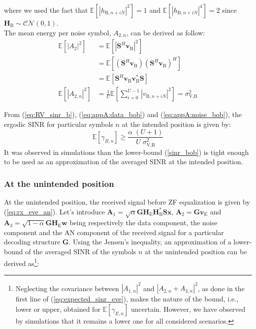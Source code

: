 \documentclass[journal,comsoc]{IEEEtran}
\newcommand{\module}[1]{\left|#1\right|}
\newcommand{\EX}[1]{\mathbb{E} \left[#1\right]}%
\newcommand{\HE}{\textbf{H}_{\text{E}}}
\newcommand{\HB}{\textbf{H}_{\text{B}}}
\newcommand{\vb}{\textbf{v}_{\text{B}}}
\newcommand{\spread}{\textbf{S}}
\newcommand{\w}{\textbf{w}}
\begin{document}
where we used the fact that $\EX{\left| h_{\text{B}, n + iN}\right|^2} = 1$ and $\EX{\left| h_{\text{B}, n + iN}\right|^4} = 2$ since $\HB \sim \mathcal{CN}(0,1)$.\\
The mean energy per noise symbol, $A_{2,n}$, can be derived as follow:
\begin{equation}
	\begin{split}
	\EX{|A_2|^2} &=  \EX{\module{\spread^H \vb}^2} \\
	&= \EX{\left(\spread^H \vb \right)\left(\spread^H \vb \right)^H} \\
	&=\EX{\spread^H \vb \vb^* \spread } \\
	\EX{|A_{2,n}|^2} &= \frac{1}{U} \EX{\sum_{i=0}^{U-1} |v_{\text{B}, n + iN}|^2} = \sigma^2_{\text{V,B}}
	\end{split}
	\label{eq:appA:noise_bob}
\end{equation}

From (\ref{eq:RV_sinr_b}), (\ref{eq:appA:data_bob}) and (\ref{eq:appA:noise_bob}), the ergodic SINR for particular symbols $n$ at the intended position is given by:
\begin{equation}
\EX{\gamma_{B,n}} \geq \frac{\alpha \;(U+1)}{U \; \sigma_{\text{V,B}}^2}
\label{sinr_bob}
\end{equation}
It was observed in simulations than the lower-bound (\ref{sinr_bob}) is tight enough to be used as an approximation of the averaged SINR at the intended position. 


\subsubsection{At the unintended position}
At the unintended position, the received signal before ZF equalization is given by (\ref{eq:rx_eve_an}). Let's introduce $\textbf{A}_1 = \sqrt{\alpha}  \textbf{G} \HE \HB^* \spread\textbf{x} $, $\textbf{A}_2 = \textbf{G}  \textbf{v}_\text{E}$ and $\textbf{A}_3 = \sqrt{1-\alpha} \textbf{G} \HE \w$ being respectively the data component, the noise component and the AN component of the received signal for a particular decoding structure $\textbf{G}$. Using the Jensen's inequality, an approximation of a lower-bound of the averaged SINR of the symbols $n$ at the unintended position can be derived as\footnote{Neglecting the covariance between $\left|A_{1,n}\right|^2$ and $\left| A_{2,n} + A_{3,n}\right|^2$, as  done in the first line of (\ref{eq:expected_sinr_eve}), makes the nature of the bound, i.e., lower or upper, obtained for $\EX{\gamma_{E,n}}$ uncertain. However, we have observed by simulations that it remains a lower one for all considered scenarios.}:
\end{document}
